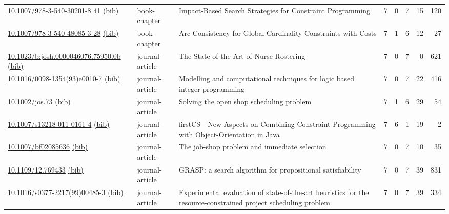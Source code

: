 {\begin{longtable}{p{5cm}lp{11cm}rrrrr}
\href{http://dx.doi.org/10.1007/978-3-540-30201-8_41}{10.1007/978-3-540-30201-8 41} \href{https://www.doi2bib.org/bib/10.1007/978-3-540-30201-8_41}{(bib)} & book-chapter & Impact-Based Search Strategies for Constraint Programming & 7 & 0 & 7 & 15 & 120 \\
\href{http://dx.doi.org/10.1007/978-3-540-48085-3_28}{10.1007/978-3-540-48085-3 28} \href{https://www.doi2bib.org/bib/10.1007/978-3-540-48085-3_28}{(bib)} & book-chapter & Arc Consistency for Global Cardinality Constraints with Costs & 7 & 1 & 6 & 12 & 27 \\
\href{http://dx.doi.org/10.1023/b:josh.0000046076.75950.0b}{10.1023/b:josh.0000046076.75950.0b} \href{https://www.doi2bib.org/bib/10.1023/b:josh.0000046076.75950.0b}{(bib)} & journal-article & The State of the Art of Nurse Rostering & 7 & 0 & 7 & 0 & 621 \\
\href{http://dx.doi.org/10.1016/0098-1354(93)e0010-7}{10.1016/0098-1354(93)e0010-7} \href{https://www.doi2bib.org/bib/10.1016/0098-1354(93)e0010-7}{(bib)} & journal-article & Modelling and computational techniques for logic based integer programming & 7 & 0 & 7 & 22 & 416 \\
\href{http://dx.doi.org/10.1002/jos.73}{10.1002/jos.73} \href{https://www.doi2bib.org/bib/10.1002/jos.73}{(bib)} & journal-article & Solving the open shop scheduling problem & 7 & 1 & 6 & 29 & 54 \\
\href{http://dx.doi.org/10.1007/s13218-011-0161-4}{10.1007/s13218-011-0161-4} \href{https://www.doi2bib.org/bib/10.1007/s13218-011-0161-4}{(bib)} & journal-article & firstCS—New Aspects on Combining Constraint Programming with Object-Orientation in Java & 7 & 6 & 1 & 19 & 2 \\
\href{http://dx.doi.org/10.1007/bf02085636}{10.1007/bf02085636} \href{https://www.doi2bib.org/bib/10.1007/bf02085636}{(bib)} & journal-article & The job-shop problem and immediate selection & 7 & 0 & 7 & 10 & 35 \\
\href{http://dx.doi.org/10.1109/12.769433}{10.1109/12.769433} \href{https://www.doi2bib.org/bib/10.1109/12.769433}{(bib)} & journal-article & GRASP: a search algorithm for propositional satisfiability & 7 & 0 & 7 & 39 & 831 \\
\href{http://dx.doi.org/10.1016/s0377-2217(99)00485-3}{10.1016/s0377-2217(99)00485-3} \href{https://www.doi2bib.org/bib/10.1016/s0377-2217(99)00485-3}{(bib)} & journal-article & Experimental evaluation of state-of-the-art heuristics for the resource-constrained project scheduling problem & 7 & 0 & 7 & 39 & 334 \\

\end{longtable}}

